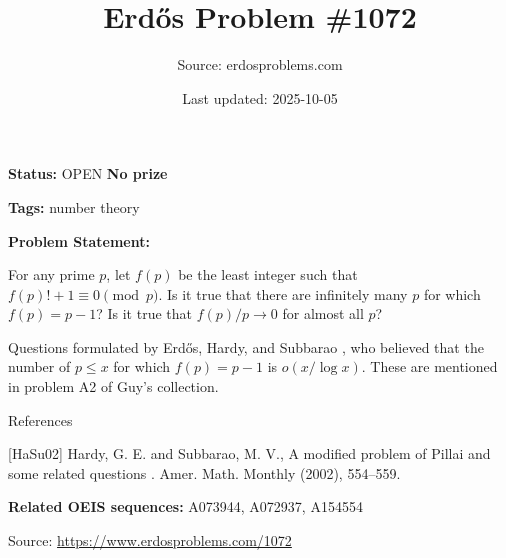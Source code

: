 \documentclass{article}
\title{Erd\H{o}s Problem \#1072}
\date{Last updated: 2025-10-05}
\author{Source: erdosproblems.com}
\begin{document}
\maketitle

\noindent\textbf{Status:} OPEN \quad \textbf{No prize}

\noindent\textbf{Tags:} number theory

\medskip

\noindent\textbf{Problem Statement:}

For any prime $p$, let $f(p)$ be the least integer such that $f(p)!+1\equiv 0\pmod{p}$. Is it true that there are infinitely many $p$ for which $f(p)=p-1$? Is it true that $f(p)/p\to 0$ for almost all $p$?




Questions formulated by Erd\H{o}s, Hardy, and Subbarao \cite{HaSu02}, who believed that the number of $p\leq x$ for which $f(p)=p-1$ is $o(x/\log x)$. These are mentioned in problem A2 of Guy's collection.




References

[HaSu02] Hardy, G. E. and Subbarao, M. V., A modified problem of Pillai and some related questions . Amer. Math. Monthly (2002), 554--559.

\noindent\textbf{Related OEIS sequences:} A073944, A072937, A154554


\bigskip
\noindent\small{Source: \url{https://www.erdosproblems.com/1072}}
\end{document}
